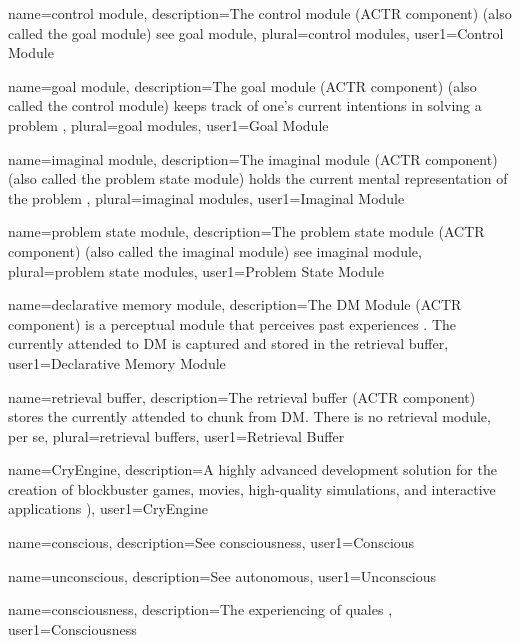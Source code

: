 {
  name=control module,
  description={The control module (\gls{ACTR} component) (also called the goal module) see \gls{goal module}},
  plural=control modules,
  user1={Control Module}
}

{
  name=goal module,
  description={The goal module (\gls{ACTR} component) (also called the control module) keeps track of one's current intentions in solving a problem \citep{Anderson2007HowCan}},
  plural=goal modules,
  user1={Goal Module}
}

{
  name=imaginal module,
  description={The imaginal module (\gls{ACTR} component) (also called the problem state module) holds the current mental representation of the  problem \citep{Anderson2007HowCan}},
  plural=imaginal modules,
  user1={Imaginal Module}
}

{
  name=problem state module,
  description={The problem state module (\gls{ACTR} component) (also called the imaginal module) see \gls{imaginal module}},
  plural=problem state modules,
  user1={Problem State Module}
}

{
  name=declarative memory module,
  description={The \gls{DM} Module (\gls{ACTR} component) is a perceptual module that perceives past experiences \citep{Anderson2007HowCan}. The currently attended to \gls{DM} is captured and stored in the \gls{retrieval buffer}},
  user1={Declarative Memory Module}
}

{
  name=retrieval buffer,
  description={The retrieval buffer (\gls{ACTR} component) stores the currently attended to \gls{chunk} from \gls{DM}. There is no retrieval module, per se},
  plural=retrieval buffers,
  user1={Retrieval Buffer}
}

{
  name=CryEngine\textregistered,
  description={A highly advanced development solution for the creation of blockbuster games, movies, high-quality simulations, and interactive applications \citep{CryEngine})},
  user1={CryEngine}
}

{
  name=conscious,
  description={See \gls{consciousness}},
  user1={Conscious}
}

{
  name=unconscious,
  description={See \gls{autonomous}},
  user1={Unconscious}
}

{
  name=consciousness,
  description={The experiencing of \glspl{quale} \citep{Cowell2001MindMachine}},
  user1={Consciousness}
}

